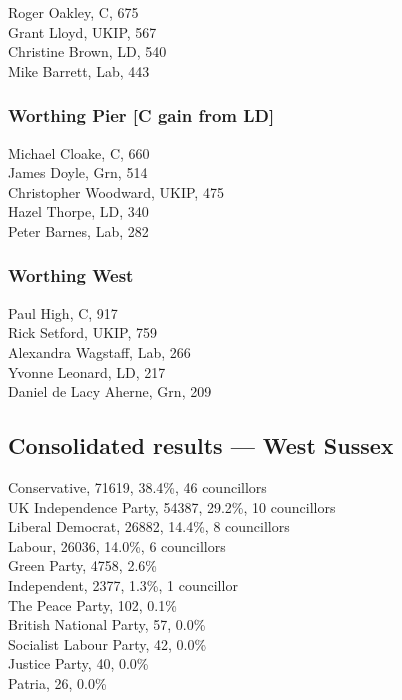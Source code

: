 \documentclass[a4paper,openany,10pt]{book}
\begin{document}


Roger Oakley, C, 675\\
Grant Lloyd, UKIP, 567\\
Christine Brown, LD, 540\\
Mike Barrett, Lab, 443\\


\subsubsection*{Worthing Pier \hspace*{\fill}\nolinebreak[1]%
\enspace\hspace*{\fill}
[C gain from LD]}



Michael Cloake, C, 660\\
James Doyle, Grn, 514\\
{Christopher Woodward}, UKIP, 475\\
Hazel Thorpe, LD, 340\\
Peter Barnes, Lab, 282\\


\subsubsection*{Worthing West}



Paul High, C, 917\\
Rick Setford, UKIP, 759\\
Alexandra Wagstaff, Lab, 266\\
Yvonne Leonard, LD, 217\\
{Daniel de Lacy Aherne}, Grn, 209\\




\subsection*{Consolidated results --- West Sussex}
Conservative, 71619, 38.4\%, 46 councillors\\
UK Independence Party, 54387, 29.2\%, 10 councillors\\
Liberal Democrat, 26882, 14.4\%, 8 councillors\\
Labour, 26036, 14.0\%, 6 councillors\\
Green Party, 4758, 2.6\% \\
Independent, 2377, 1.3\%, 1 councillor\\
The Peace Party, 102, 0.1\% \\
British National Party, 57, 0.0\% \\
Socialist Labour Party, 42, 0.0\% \\
Justice Party, 40, 0.0\% \\
Patria, 26, 0.0\% \\
\end{document}
